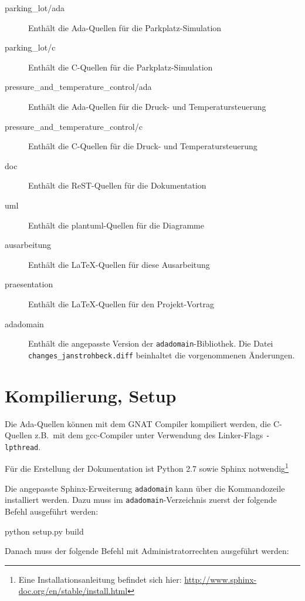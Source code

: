 \documentclass[oneside]{elaboration}
\begin{document}
\begin{description}
    \item[parking\_lot/ada] Enthält die Ada-Quellen für die Parkplatz-Simulation
    \item[parking\_lot/c] Enthält die C-Quellen für die Parkplatz-Simulation
    \item[pressure\_and\_temperature\_control/ada] Enthält die Ada-Quellen für die Druck- und Temperatursteuerung 
    \item[pressure\_and\_temperature\_control/c] Enthält die C-Quellen für die Druck- und Temperatursteuerung 
    \item[doc] Enthält die ReST-Quellen für die Dokumentation
    \item[uml] Enthält die plantuml-Quellen für die Diagramme
    \item[ausarbeitung] Enthält die LaTeX-Quellen für diese Ausarbeitung
    \item[praesentation] Enthält die LaTeX-Quellen für den Projekt-Vortrag
    \item[adadomain] Enthält die angepasste Version der
        \texttt{adadomain}-Bibliothek. Die Datei
        \texttt{changes\_janstrohbeck.diff} beinhaltet die vorgenommenen
        Änderungen.
\end{description}

\section{Kompilierung, Setup}
\label{sec:kompilierung_setup}

Die Ada-Quellen können mit dem GNAT Compiler kompiliert werden, die C-Quellen
z.B.\ mit dem gcc-Compiler unter Verwendung des Linker-Flags \texttt{-lpthread}.

Für die Erstellung der Dokumentation ist Python 2.7 sowie Sphinx
notwendig\footnote{Eine Installationsanleitung befindet sich hier:
\url{http://www.sphinx-doc.org/en/stable/install.html}}

Die angepasste Sphinx-Erweiterung \texttt{adadomain} kann über die Kommandozeile
installiert werden. Dazu muss im \texttt{adadomain}-Verzeichnis zuerst der
folgende Befehl ausgeführt werden:

\begin{bashcode}
    python setup.py build
\end{bashcode}

Danach muss der folgende Befehl mit Administratorrechten ausgeführt werden:
\end{document}
